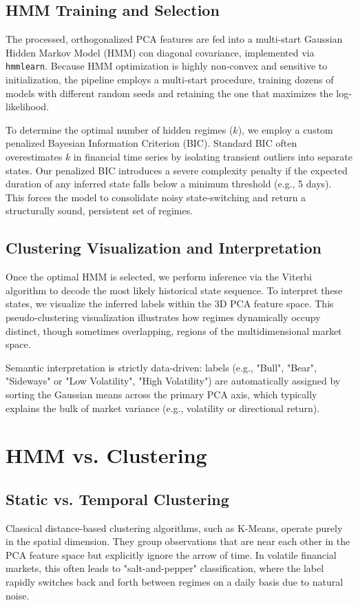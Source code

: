 \documentclass[a4paper,fleqn]{cas-sc}
\begin{document}
\subsection{HMM Training and Selection}
The processed, orthogonalized PCA features are fed into a multi-start Gaussian Hidden Markov Model (HMM) con diagonal covariance, implemented via \texttt{hmmlearn}. Because HMM optimization is highly non-convex and sensitive to initialization, the pipeline employs a multi-start procedure, training dozens of models with different random seeds and retaining the one that maximizes the log-likelihood.

To determine the optimal number of hidden regimes ($k$), we employ a custom penalized Bayesian Information Criterion (BIC). Standard BIC often overestimates $k$ in financial time series by isolating transient outliers into separate states. Our penalized BIC introduces a severe complexity penalty if the expected duration of any inferred state falls below a minimum threshold (e.g., 5 days). This forces the model to consolidate noisy state-switching and return a structurally sound, persistent set of regimes.

\subsection{Clustering Visualization and Interpretation}
Once the optimal HMM is selected, we perform inference via the Viterbi algorithm to decode the most likely historical state sequence. To interpret these states, we visualize the inferred labels within the 3D PCA feature space. This pseudo-clustering visualization illustrates how regimes dynamically occupy distinct, though sometimes overlapping, regions of the multidimensional market space.

Semantic interpretation is strictly data-driven: labels (e.g., "Bull", "Bear", "Sideways" or "Low Volatility", "High Volatility") are automatically assigned by sorting the Gaussian means across the primary PCA axis, which typically explains the bulk of market variance (e.g., volatility or directional return).

\section{HMM vs. Clustering}

\subsection{Static vs. Temporal Clustering}
Classical distance-based clustering algorithms, such as K-Means, operate purely in the spatial dimension. They group observations that are near each other in the PCA feature space but explicitly ignore the arrow of time. In volatile financial markets, this often leads to "salt-and-pepper" classification, where the label rapidly switches back and forth between regimes on a daily basis due to natural noise. 
\end{document}
